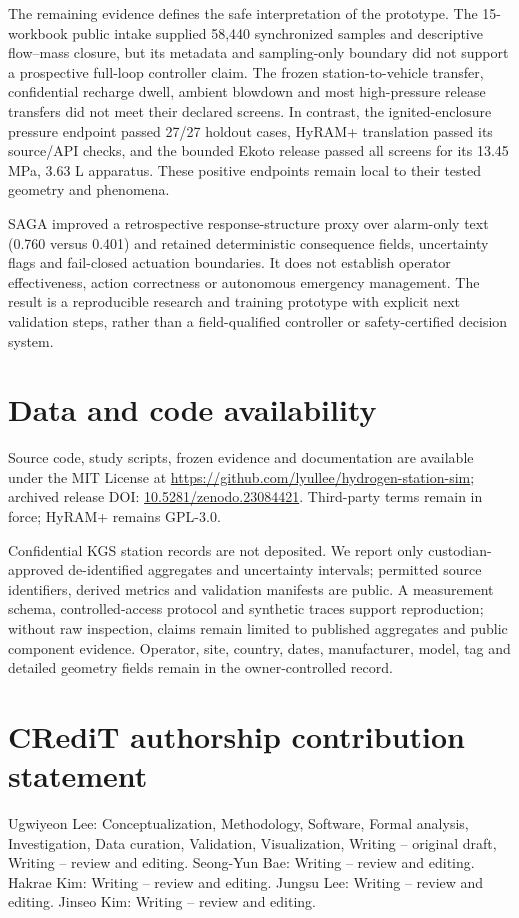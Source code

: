 \documentclass[12pt,a4paper]{article}
\begin{document}
The remaining evidence defines the safe interpretation of the prototype. The
15-workbook public intake supplied 58,440 synchronized samples and descriptive
flow--mass closure, but its metadata and sampling-only boundary did not support a
prospective full-loop controller claim. The frozen station-to-vehicle transfer,
confidential recharge dwell, ambient blowdown and most high-pressure release
transfers did not meet their declared screens. In contrast, the ignited-enclosure
pressure endpoint passed 27/27 holdout cases, HyRAM+ translation passed its
source/API checks, and the bounded Ekoto release passed all screens for its
13.45 MPa, 3.63 L apparatus. These positive endpoints remain local to their
tested geometry and phenomena.

SAGA improved a retrospective response-structure proxy over alarm-only text
(0.760 versus 0.401) and retained deterministic consequence fields, uncertainty
flags and fail-closed actuation boundaries. It does not establish operator
effectiveness, action correctness or autonomous emergency management. The result
is a reproducible research and training prototype with explicit next validation
steps, rather than a field-qualified controller or safety-certified decision
system.

\section*{Data and code availability}
Source code, study scripts, frozen evidence and documentation are available under
the MIT License at \url{https://github.com/lyullee/hydrogen-station-sim}; archived
release DOI: \href{https://doi.org/10.5281/zenodo.23084421}{10.5281/zenodo.23084421}.
Third-party terms remain in force; HyRAM+ remains GPL-3.0.

Confidential KGS station records are not deposited. We report only custodian-approved
de-identified aggregates and uncertainty intervals; permitted source identifiers,
derived metrics and validation manifests are public. A measurement schema,
controlled-access protocol and synthetic traces support reproduction; without raw
inspection, claims remain limited to published aggregates and public component
evidence. Operator, site, country, dates, manufacturer, model, tag and detailed
geometry fields remain in the owner-controlled record.

\section*{CRediT authorship contribution statement}
Ugwiyeon Lee: Conceptualization, Methodology, Software, Formal analysis, Investigation,
Data curation, Validation, Visualization, Writing -- original draft, Writing -- review
and editing. Seong-Yun Bae: Writing -- review and editing. Hakrae Kim: Writing -- review
and editing. Jungsu Lee: Writing -- review and editing. Jinseo Kim: Writing -- review
and editing.
\end{document}
